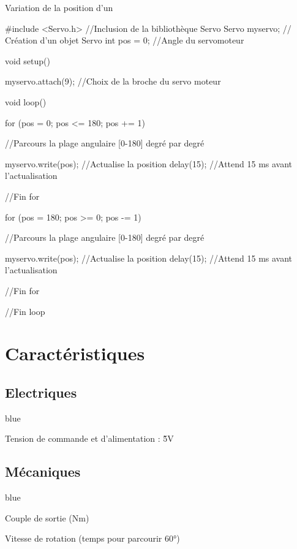 \begin{Cpp}{Variation de la position d'un \servo}

  #include <Servo.h>      //Inclusion de la bibliothèque Servo
  Servo myservo;  // Création d'un objet Servo
  int pos = 0;    //Angle du servomoteur
  
  void setup() {

    myservo.attach(9);  //Choix de la broche du servo moteur

  }
  
  void loop() {

    for (pos = 0; pos <= 180; pos += 1) { //Parcours la plage angulaire [0-180] degré par degré

      myservo.write(pos);              //Actualise la position 
      delay(15);                       //Attend 15 ms avant l'actualisation

    }//Fin for

    for (pos = 180; pos >= 0; pos -= 1) {     //Parcours la plage angulaire [0-180] degré par degré

      myservo.write(pos);              //Actualise la position 
      delay(15);                       //Attend 15 ms avant l'actualisation

    }//Fin for
  }//Fin loop

\end{Cpp}


\section{Caractéristiques}


\subsection{Electriques}


\begin{items}{blue}{\Bullet}
  \item Tension de commande et d'alimentation : \~5V
\end{items}

\subsection{Mécaniques}

\begin{items}{blue}{\Bullet}
  \item Couple de sortie (Nm)
  \item Vitesse de rotation (temps pour parcourir 60°)
\end{items}




